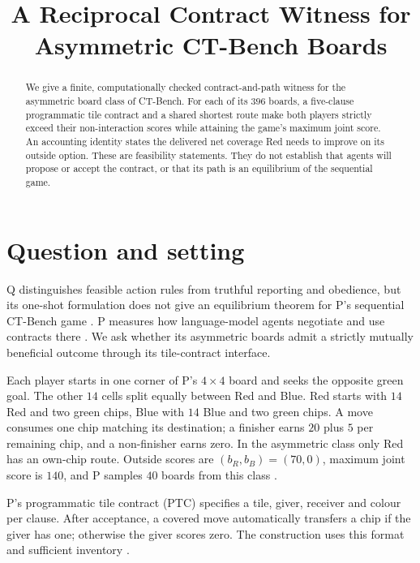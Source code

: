 \documentclass{article}
\title{A Reciprocal Contract Witness for Asymmetric CT-Bench Boards}
\begin{document}
\maketitle

\begin{abstract}
We give a finite, computationally checked contract-and-path witness for the asymmetric board class of
CT-Bench. For each of its \(396\) boards, a five-clause programmatic tile contract and a shared shortest route
make both players strictly exceed their non-interaction scores while attaining the game's maximum joint score.
An accounting identity states the delivered net coverage Red needs to improve on its outside option. These are
feasibility statements. They do not establish that agents will propose or accept the contract, or that its
path is an equilibrium of the sequential game. %
\end{abstract}

\section{Question and setting}

Q distinguishes feasible action rules from truthful reporting and obedience, but its one-shot formulation does
not give an equilibrium theorem for P's sequential CT-Bench game \cite{bergemann2026mechanism}. P measures how
language-model agents negotiate and use contracts there \cite{wyse2026commitment}. We ask whether its
asymmetric boards admit a strictly mutually beneficial outcome through its tile-contract interface.

Each player starts in one corner of P's \(4\times4\) board and seeks the opposite green goal. The other
\(14\) cells split equally between Red and Blue. Red starts with \(14\) Red and two green chips, Blue with
\(14\) Blue and two green chips. A move consumes one chip matching its destination; a finisher earns \(20\)
plus \(5\) per remaining chip, and a non-finisher earns zero. In the asymmetric class only Red has an
own-chip route. Outside scores are \((b_R,b_B)=(70,0)\), maximum joint score is \(140\), and P samples \(40\)
boards from this class \cite{wyse2026commitment}. %

P's programmatic tile contract (PTC) specifies a tile, giver, receiver and colour per clause. After acceptance,
a covered move automatically transfers a chip if the giver has one; otherwise the giver scores zero. The
construction uses this format and sufficient inventory \cite{wyse2026commitment}. %
\end{document}
